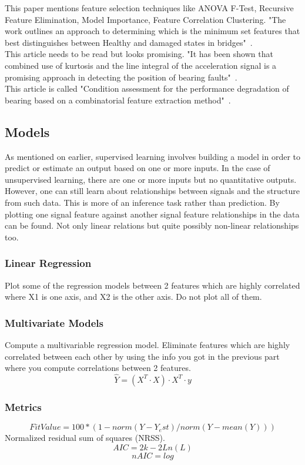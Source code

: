 \documentclass{article}
\begin{document}
This paper mentions feature selection techniques like ANOVA F-Test, Recursive Feature Elimination, Model Importance, Feature Correlation Clustering. "The work outlines an approach to determining which is the minimum set features that best distinguishes between Healthy and damaged states in bridges"~\cite{buckley2023feature}.\\
This article needs to be read but looks promising. "It has been shown that combined use of kurtosis and the line integral of the acceleration signal is a promising approach in detecting the position of bearing faults"~\cite{kateris2014machine}.\\
This article is called "Condition assessment for the performance degradation of bearing based on a combinatorial feature extraction method"~\cite{hong2014condition}.
\subsection{Models}
As mentioned on earlier, supervised learning involves building a model in order to predict or estimate an output based on one or more inputs. In the case of unsupervised learning, there are one or more inputs but no quantitative outputs. However, one can still learn about relationships between signals and the structure from such data. This is more of an inference task rather than prediction.
By plotting one signal feature against another signal feature relationships in the data can be found. Not only linear relations but quite possibly non-linear relationships too.
\subsubsection{Linear Regression}
Plot some of the regression models between 2 features which are highly correlated where X1 is one axis, and X2 is the other axis. Do not plot all of them.
\subsubsection{Multivariate Models}
Compute a multivariable regression model.
Eliminate features which are highly correlated between each other by using the info you got in the previous part where you compute correlations between 2 features.
$$ \hat{Y} = (X^T \cdot X) \cdot X^T \cdot y $$
\subsubsection{Metrics}
$$ FitValue = 100 * (1-norm(Y-Y_est)/norm(Y-mean(Y))) $$
Normalized residual sum of squares (NRSS).
$$ AIC = 2k - 2Ln(L) $$  
$$ nAIC = log $$
\end{document}
